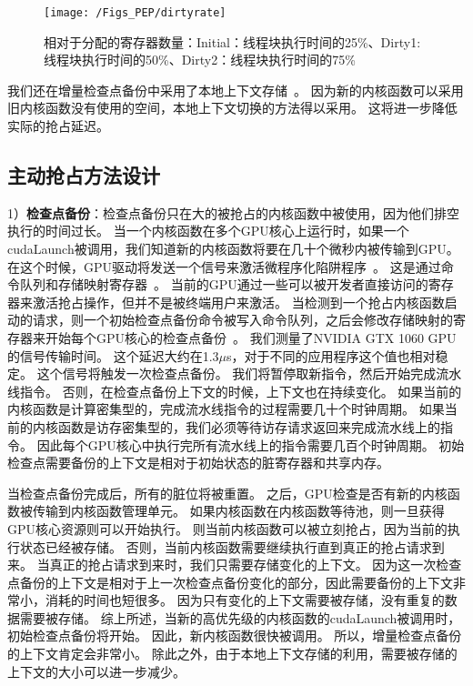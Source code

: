 \begin{figure}[htbp] %
  \centering
  \texttt{[image: /Figs\_PEP/dirtyrate]}
  \caption{相对于分配的寄存器数量：Initial：线程块执行时间的25\%、Dirty1: 线程块执行时间的50\%、Dirty2：线程块执行时间的75\%}
  \label{fig:dirtyrate}
\end{figure}


我们还在增量检查点备份中采用了本地上下文存储~。
因为新的内核函数可以采用旧内核函数没有使用的空间，本地上下文切换的方法得以采用。
这将进一步降低实际的抢占延迟。

\subsection{主动抢占方法设计}

1）\textbf{检查点备份}：检查点备份只在大的被抢占的内核函数中被使用，因为他们排空执行的时间过长。
当一个内核函数在多个GPU核心上运行时，如果一个cudaLaunch被调用，我们知道新的内核函数将要在几十个微秒内被传输到GPU。
在这个时候，GPU驱动将发送一个信号来激活微程序化陷阱程序~。
这是通过命令队列和存储映射寄存器~。
当前的GPU通过一些可以被开发者直接访问的寄存器来激活抢占操作，但并不是被终端用户来激活。
当检测到一个抢占内核函数启动的请求，则一个初始检查点备份命令被写入命令队列，之后会修改存储映射的寄存器来开始每个GPU核心的检查点备份~。
我们测量了NVIDIA GTX 1060 GPU的信号传输时间。
这个延迟大约在1.3$\mu$s，对于不同的应用程序这个值也相对稳定。
这个信号将触发一次检查点备份。
我们将暂停取新指令，然后开始完成流水线指令。
否则，在检查点备份上下文的时候，上下文也在持续变化。
如果当前的内核函数是计算密集型的，完成流水线指令的过程需要几十个时钟周期。
如果当前的内核函数是访存密集型的，我们必须等待访存请求返回来完成流水线上的指令。
因此每个GPU核心中执行完所有流水线上的指令需要几百个时钟周期。
初始检查点需要备份的上下文是相对于初始状态的脏寄存器和共享内存。

当检查点备份完成后，所有的脏位将被重置。
之后，GPU检查是否有新的内核函数被传输到内核函数管理单元。
如果内核函数在内核函数等待池，则一旦获得GPU核心资源则可以开始执行。
则当前内核函数可以被立刻抢占，因为当前的执行状态已经被存储。
否则，当前内核函数需要继续执行直到真正的抢占请求到来。
当真正的抢占请求到来时，我们只需要存储变化的上下文。
因为这一次检查点备份的上下文是相对于上一次检查点备份变化的部分，因此需要备份的上下文非常小，消耗的时间也短很多。
因为只有变化的上下文需要被存储，没有重复的数据需要被存储。
综上所述，当新的高优先级的内核函数的cudaLaunch被调用时，初始检查点备份将开始。
因此，新内核函数很快被调用。
所以，增量检查点备份的上下文肯定会非常小。
除此之外，由于本地上下文存储的利用，需要被存储的上下文的大小可以进一步减少。

